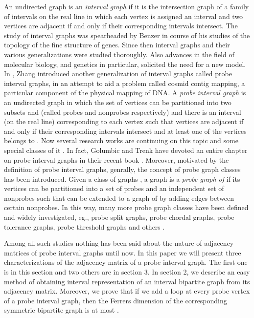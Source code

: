 \documentclass[secthm]{elsart}
\begin{document}
An undirected graph  is an {\em{interval graph}} if it is the intersection graph of a family of intervals on the real line in which each vertex is assigned an interval and two vertices are adjacent if and only if their corresponding intervals intersect. The study of interval graphs was spearheaded by Benzer \cite{B} in course of his studies of the topology of the fine structure of genes. Since then interval graphs and their various generalizations were studied thoroughly. Also advances in the field of molecular biology, and genetics in particular, solicited the need for a new model. In \cite{Z}, Zhang introduced another generalization of interval graphs called probe interval graphs, in an attempt to aid a problem called cosmid contig mapping, a particular component of the physical mapping of DNA. A {\em{probe interval graph}} is an undirected graph  in which the set of vertices  can be partitioned into two subsets  and  (called probes and nonprobes respectively) and there is an interval (on the real line) corresponding to each vertex such that vertices are adjacent if and only if their corresponding intervals intersect and at least one of the vertices belongs to . Now several research works are continuing on this topic and some special classes of it \cite{BL,CK,GL,JS,MWZ,LS}. In fact, Golumbic and Trenk have devoted an entire chapter on probe interval graphs in their recent book \cite{GT}. Moreover, motivated by the definition of probe interval graphs, genrally, the concept of probe graph classes has been introduced. Given a class of graphs , a graph  is a {\em probe graph of}  if its vertices can be partitioned into a set  of probes and an independent set  of nonprobes such that  can be extended to a graph of  by adding edges between certain nonprobes. In this way, many more probe graph classes have been defined and widely investigated, eg., probe split graphs, probe chordal graphs, probe tolerance graphs, probe threshold graphs and others \cite{BGL,CKKLP,RB,RLB}.

Among all such studies nothing has been said about the nature of adjacency matrices of probe interval graphs until now. In this paper we will present three characterizations of the adjacency matrix of a probe interval graph. The first one is in this section and two others are in section 3. In section 2, we describe an easy method of obtaining interval representation of an interval bipartite graph from its adjacency matrix. Moreover, we prove that if we add a loop at every probe vertex of a probe interval graph, then the Ferrers dimension of the corresponding symmetric bipartite graph is at most .
\end{document}
